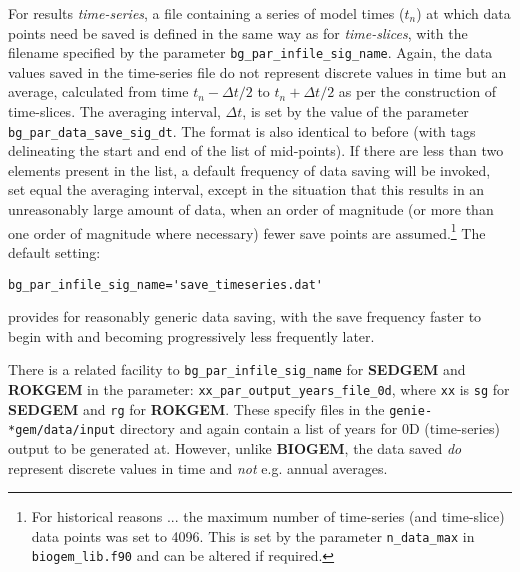 \documentclass[11pt,fleqn]{book} %
\begin{document}
For results \textit{time-series}, a file containing a series of model times (\begin{math}t_{n}\end{math}) at which data points need be saved is defined in the same way as for \textit{time-slices}, with the filename specified by the parameter \texttt{bg\_par\_infile\_sig\_name}. Again, the data values saved in the time-series file do not represent discrete values in time but an average, calculated from time \begin{math}t_{n} - \Delta t/2\end{math} to \begin{math}t_{n} + \Delta t/2\end{math} as per the construction of time-slices. The averaging interval, \begin{math}\Delta t\end{math}, is set by the value of the parameter \texttt{bg\_par\_data\_save\_sig\_dt}. The format is also identical to before (with tags delineating the start and end of the list of mid-points). If there are less than two elements present in the list, a default frequency of data saving will be invoked, set equal the averaging interval, except in the situation that this results in an unreasonably large amount of data, when an order of magnitude (or more than one order of magnitude where necessary) fewer save points are assumed.\footnote{For historical reasons ... the maximum number of time-series (and time-slice) data points was set to 4096. This is set by the parameter \texttt{n\_data\_max} in \texttt{biogem\_lib.f90} and can be altered if required.} The default setting:
\small\begin{verbatim}bg_par_infile_sig_name='save_timeseries.dat'\end{verbatim}\normalsize
provides for reasonably generic data saving, with the save frequency faster to begin with and becoming progressively less frequently later.

There is a related facility to \texttt{bg\_par\_infile\_sig\_name} for \textbf{SEDGEM} and \textbf{ROKGEM} in the parameter: \texttt{xx\_par\_output\_years\_file\_0d}, where \texttt{xx} is \texttt{sg} for \textbf{SEDGEM} and \texttt{rg} for \textbf{ROKGEM}. These specify files in the \texttt{genie-*gem/data/input} directory and again contain a list of years for 0D (time-series) output to be generated at. However, unlike \textbf{BIOGEM}, the data saved \textit{do} represent discrete values in time and \textit{not} e.g. annual averages.
\end{document}
